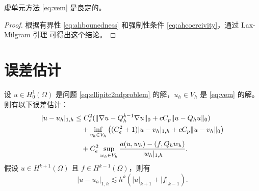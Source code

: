 \begin{theorem}
虚单元方法 \eqref{eq:vem} 是良定的。
\end{theorem}
\begin{proof}
根据有界性 \eqref{eq:ahbounedness} 和强制性条件
\eqref{eq:ahcoercivity}，通过 Lax-Milgram 引理 \cite{LaxMilgram1954}
可得出这个结论。
\end{proof}

\section{误差估计}

\begin{theorem}\label{thm:errorestimateH1}
设 $u\in H_0^1(\Omega)$ 是问题 \eqref{eq:ellipitc2ndproblem} 的解，$u_h\in V_h$
是 \eqref{eq:vem} 的解。则有以下误差估计：
\begin{align}
\label{eq:errorestimateH1abs}
|u-u_h|_{1,h}&\leq C_e^2(\|\nabla u-Q_h^{k-1}\nabla u\|_0+c C_p\|u-Q_hu\|_0) \\
\notag
&\quad + \inf_{v_h\in V_h}\big((C_e^2+1)|u-v_h|_{1,h}+c C_p\|u-v_h\|_0\big)\\
\notag
&\quad + C_e^2\sup_{w_h\in V_h}\frac{a(u,w_h)-(f, Q_hw_h)}{|w_h|_{1,h}}.
\end{align}
假设 $u\in H^{k+1}(\Omega)$ 且 $f\in H^{k-1}(\Omega)$，则有
\begin{equation}\label{eq:errorestimateH1}
|u-u_h|_{1,h}\lesssim h^k(|u|_{k+1}+|f|_{k-1}).
\end{equation}
\end{theorem}

